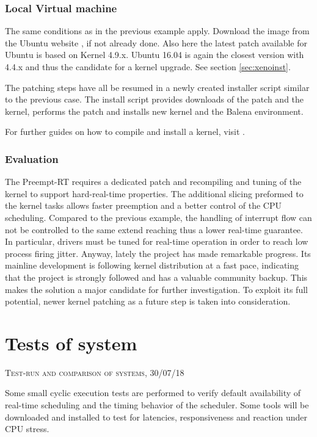 \documentclass[]{scrartcl}
\begin{document}
\subsubsection{Local Virtual machine}

The same conditions as in the previous example apply. Download the image from the Ubuntu website \cite{ubuntu02}, if not already done. Also here the latest patch available for Ubuntu is based on Kernel 4.9.x. Ubuntu 16.04 is again the closest version with 4.4.x and thus the candidate for a kernel upgrade. See section \ref{sec:xenoinst}.

The patching steps have all be resumed in a newly created installer script similar to the previous case. The install script provides downloads of the patch and the kernel, performs the patch and installs new kernel and the Balena environment.

For further guides on how to compile and install a kernel, visit \cite{misc01}.

\subsubsection{Evaluation}

The Preempt-RT requires a dedicated patch and recompiling and tuning of the kernel to support hard-real-time properties. The additional slicing preformed to the kernel tasks allows faster preemption and a better control of the CPU scheduling.
Compared to the previous example, the handling of interrupt flow can not be controlled to the same extend reaching thus a lower real-time guarantee. In particular, drivers must be tuned for real-time operation in order to reach low process firing jitter.
Anyway, lately the project has made remarkable progress.
Its mainline development is following kernel distribution at a fast pace, indicating that the project is strongly followed and has a valuable community backup. This makes the solution a major candidate for further investigation.
To exploit its full potential, newer kernel patching as a future step is taken into consideration.

\section{Tests of system}

{\small\textsc{Test-run and comparison of systems, 30/07/18} \bigskip}

Some small cyclic execution tests are performed to verify default availability of real-time scheduling and the timing behavior of the scheduler. Some tools will be downloaded and installed to test for latencies, responsiveness and reaction under CPU stress. 
\end{document}
